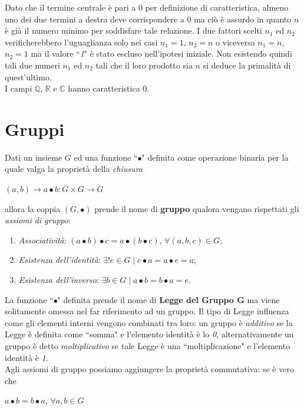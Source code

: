 \documentclass[a4paper,12pt]{tesiinfo}
\begin{document}
Dato che il termine centrale \`e pari a 0 per definizione di caratteristica, almeno uno dei due termini a destra deve corrispondere a 0 ma ci\`o \`e assurdo in quanto $n$ \`e gi\`a il numero minimo per soddisfare tale relazione. I due fattori scelti $n_1$ ed $n_2$ verificherebbero l'uguaglianza solo nei casi $n_1=1$, $n_2=n$ o viceversa $n_1=n$, $n_2=1$ ma il valore ``\emph{1}" \`e stato escluso nell'ipotesi iniziale. Non esistendo quindi tali due numeri $n_1$ ed $n_2$ tali che il loro prodotto sia $n$ si deduce la primalit\`a di quest'ultimo.
\\
I campi $\mathbb{Q}$, $\mathbb{R}$ e $\mathbb{C}$ hanno caratteristica $0$.
\section{Gruppi}
\label{base gruppi}
Dati un insieme $G$ ed una funzione ``$\bullet$" definita come operazione binaria per la quale valga la propriet\`a della \textit{chiusura}
\begin{center}
 $(a, b) \to a \bullet b : G \times G \to G$
\end{center}allora la coppia $(G, \bullet)$ prende il nome di \textbf{gruppo} qualora vengano rispettati gli \textit{assiomi di gruppo}:
\begin{enumerate}
 \item \textit{Associativit\`a}: $\left ( a\bullet b \right ) \bullet c = a \bullet \left ( b \bullet c \right ) $, $ \forall (a, b, c) \in G$;
 \item \textit{Esistenza dell'identit\`a}: $ \exists ! e \in G \mid e \bullet a = a \bullet e = a$;
 \item \textit{Esistenza dell'inverso}: $\exists b \in G \mid a \bullet b = b \bullet a = e$.
\end{enumerate} 
La funzione ``$\bullet$" definita prende il nome di \textbf{Legge del Gruppo G} ma viene solitamente omessa nel far riferimento ad un gruppo. Il tipo di Legge influenza come gli elementi interni vengono combinati tra loro: un gruppo \`e \textit{additivo} se la Legge \`e definita come ``somma" e l'elemento identit\`a \`e lo \emph{0}, alternativamente un gruppo \`e detto \textit{moltiplicativo} se tale Legge \`e una ``moltiplicazione" e l'elemento identit\`a \`e \emph{1}.\\
Agli assiomi di gruppo possiamo aggiungere la propriet\`a commutativa: se \`e vero che \begin{center}
 $ a \bullet b = b \bullet a$, $ \forall a, b \in G$
\end{center} 
\end{document}
